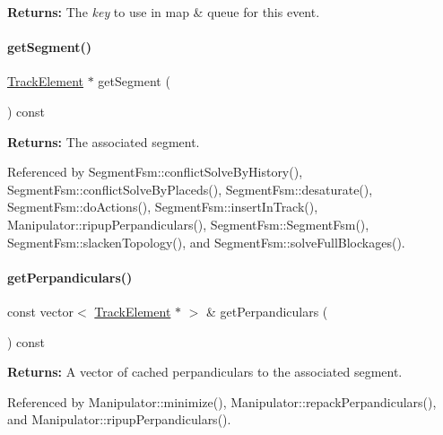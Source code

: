 {\bfseries Returns\+:} The {\itshape key} to use in map \& queue for this event. \mbox{\label{classKite_1_1RoutingEvent_a506a4d1cef59fc35984c1c88e0c0f6df}} 
\paragraph{\texorpdfstring{get\+Segment()}{getSegment()}}
{\footnotesize\ttfamily \mbox{\hyperlink{classKite_1_1TrackElement}{Track\+Element}} $\ast$ get\+Segment (\begin{DoxyParamCaption}{ }\end{DoxyParamCaption}) const\hspace{0.3cm}{\ttfamily [inline]}}

{\bfseries Returns\+:} The associated segment. 

Referenced by Segment\+Fsm\+::conflict\+Solve\+By\+History(), Segment\+Fsm\+::conflict\+Solve\+By\+Placeds(), Segment\+Fsm\+::desaturate(), Segment\+Fsm\+::do\+Actions(), Segment\+Fsm\+::insert\+In\+Track(), Manipulator\+::ripup\+Perpandiculars(), Segment\+Fsm\+::\+Segment\+Fsm(), Segment\+Fsm\+::slacken\+Topology(), and Segment\+Fsm\+::solve\+Full\+Blockages().

\mbox{\label{classKite_1_1RoutingEvent_ab7d24e13f7b2c62cedce1fda2da7b7f5}} 
\paragraph{\texorpdfstring{get\+Perpandiculars()}{getPerpandiculars()}}
{\footnotesize\ttfamily const vector$<$ \mbox{\hyperlink{classKite_1_1TrackElement}{Track\+Element}} $\ast$ $>$ \& get\+Perpandiculars (\begin{DoxyParamCaption}{ }\end{DoxyParamCaption}) const\hspace{0.3cm}{\ttfamily [inline]}}

{\bfseries Returns\+:} A vector of cached perpandiculars to the associated segment. 

Referenced by Manipulator\+::minimize(), Manipulator\+::repack\+Perpandiculars(), and Manipulator\+::ripup\+Perpandiculars().

